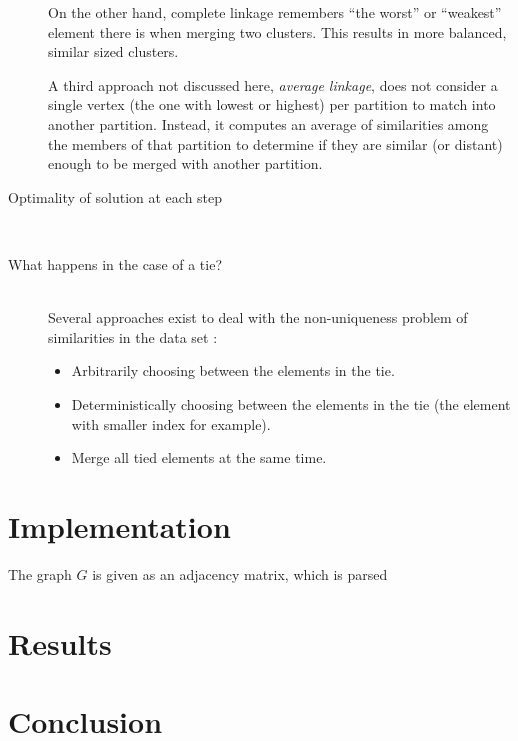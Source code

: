 \documentclass[12pt,a4paper]{article}
\begin{document}
\begin{description}
  On the other hand, complete linkage remembers ``the worst'' or
  ``weakest'' element there is when merging two clusters. This results
  in more balanced, similar sized clusters.

  A third approach not discussed here, \emph{average linkage}, does
  not consider a single vertex (the one with lowest or highest) per
  partition to match into another partition. Instead, it computes an
  average of similarities among the members of that partition to
  determine if they are similar (or distant) enough to be merged with
  another partition.

\item[Optimality of solution at each step] \hfill \\



\item[What happens in the case of a tie?]  \hfill \\

  Several approaches exist to deal with the non-uniqueness problem of
  similarities in the data set \cite{nonunique}:

  \begin{itemize}
  \item Arbitrarily choosing between the elements in the tie.
  \item Deterministically choosing between the elements in the tie
    (the element with smaller index for example).
  \item Merge all tied elements at the same time.
  \end{itemize}



\end{description}



\section{Implementation}

The graph $ G $ is given as an adjacency matrix, which is parsed

\section{Results}

\section{Conclusion}
\end{document}

